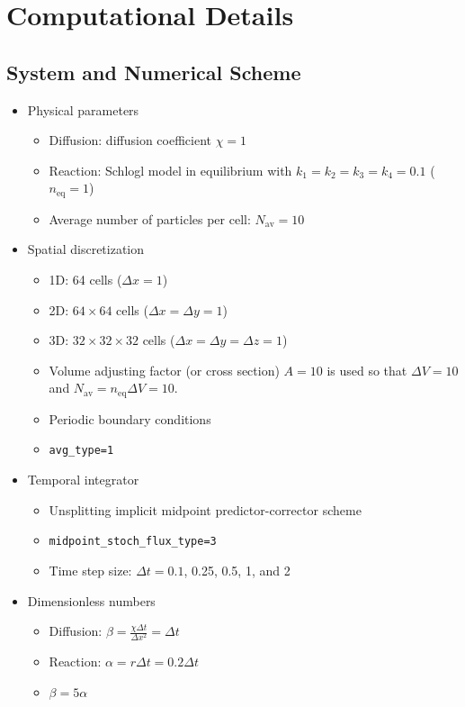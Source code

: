 \documentclass{article}
\begin{document}
\section{Computational Details}

\subsection{System and Numerical Scheme}

\begin{itemize}

\item Physical parameters
\begin{itemize}
\item Diffusion: diffusion coefficient $\chi=1$
\item Reaction: Schlogl model in equilibrium with $k_1=k_2=k_3=k_4=0.1$ ($n_\mathrm{eq}=1$)
\item Average number of particles per cell: $N_\mathrm{av}=10$
\end{itemize}

\item Spatial discretization
\begin{itemize}
\item 1D: 64 cells ($\Delta x=1$)
\item 2D: $64\times64$ cells ($\Delta x=\Delta y=1$)
\item 3D: $32\times32\times32$ cells ($\Delta x=\Delta y=\Delta z=1$)
\item Volume adjusting factor (or cross section) $A=10$ is used so that $\Delta V=10$ and $N_\mathrm{av}=n_\mathrm{eq}\Delta V=10$.
\item Periodic boundary conditions
\item \texttt{avg\_type=1}
\end{itemize}

\item Temporal integrator
\begin{itemize}
\item Unsplitting implicit midpoint predictor-corrector scheme
\item \texttt{midpoint\_stoch\_flux\_type=3}
\item Time step size: $\Delta t=0.1$, 0.25, 0.5, 1, and 2
\end{itemize}

\item Dimensionless numbers
\begin{itemize}
\item Diffusion: $\beta=\frac{\chi\Delta t}{\Delta x^2}=\Delta t$
\item Reaction: $\alpha = r\Delta t = 0.2\Delta t$
\item $\beta=5\alpha$
\end{itemize}

\end{itemize}
\end{document}
